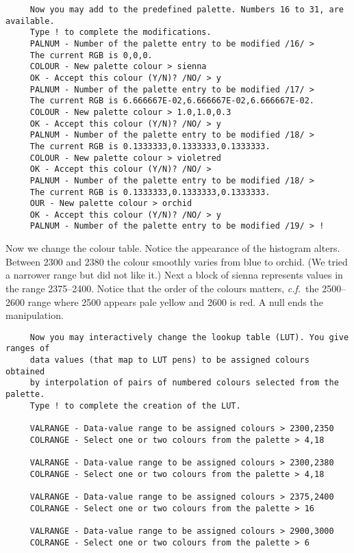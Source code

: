 {\small
\begin{verbatim}
     Now you may add to the predefined palette. Numbers 16 to 31, are available.
     Type ! to complete the modifications.
     PALNUM - Number of the palette entry to be modified /16/ >
     The current RGB is 0,0,0.
     COLOUR - New palette colour > sienna
     OK - Accept this colour (Y/N)? /NO/ > y
     PALNUM - Number of the palette entry to be modified /17/ >
     The current RGB is 6.666667E-02,6.666667E-02,6.666667E-02.
     COLOUR - New palette colour > 1.0,1.0,0.3
     OK - Accept this colour (Y/N)? /NO/ > y
     PALNUM - Number of the palette entry to be modified /18/ >
     The current RGB is 0.1333333,0.1333333,0.1333333.
     COLOUR - New palette colour > violetred
     OK - Accept this colour (Y/N)? /NO/ >
     PALNUM - Number of the palette entry to be modified /18/ >
     The current RGB is 0.1333333,0.1333333,0.1333333.
     OUR - New palette colour > orchid
     OK - Accept this colour (Y/N)? /NO/ > y
     PALNUM - Number of the palette entry to be modified /19/ > !
\end{verbatim}
\normalsize
Now we change the colour table.  Notice the appearance of the histogram
alters.  Between 2300 and 2380 the colour smoothly varies from blue to
orchid. (We tried a narrower range but did not like it.)  Next a
block of sienna represents values in the range 2375--2400.  Notice that
the order of the colours matters, {\it c.f.}\ the 2500--2600 range
where 2500 appears pale yellow and 2600 is red.  A null ends the
manipulation.

\small
\begin{verbatim}
     Now you may interactively change the lookup table (LUT). You give ranges of
     data values (that map to LUT pens) to be assigned colours obtained
     by interpolation of pairs of numbered colours selected from the palette.
     Type ! to complete the creation of the LUT.

     VALRANGE - Data-value range to be assigned colours > 2300,2350
     COLRANGE - Select one or two colours from the palette > 4,18

     VALRANGE - Data-value range to be assigned colours > 2300,2380
     COLRANGE - Select one or two colours from the palette > 4,18
 
     VALRANGE - Data-value range to be assigned colours > 2375,2400
     COLRANGE - Select one or two colours from the palette > 16
 
     VALRANGE - Data-value range to be assigned colours > 2900,3000
     COLRANGE - Select one or two colours from the palette > 6
 

\end{verbatim}}
